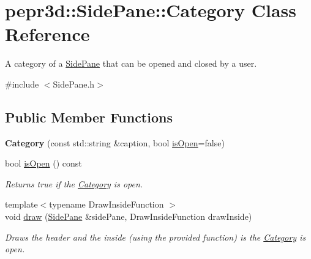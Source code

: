 \hypertarget{classpepr3d_1_1_side_pane_1_1_category}{}\section{pepr3d\+::Side\+Pane\+::Category Class Reference}
\label{classpepr3d_1_1_side_pane_1_1_category}


A category of a \mbox{\hyperlink{classpepr3d_1_1_side_pane}{Side\+Pane}} that can be opened and closed by a user.  




{\ttfamily \#include $<$Side\+Pane.\+h$>$}

\subsection*{Public Member Functions}
\begin{DoxyCompactItemize}
\item 
\mbox{\label{classpepr3d_1_1_side_pane_1_1_category_acb1fc3a5d7bd9101fcb8f4379cc70a02}} 
{\bfseries Category} (const std\+::string \&caption, bool \mbox{\hyperlink{classpepr3d_1_1_side_pane_1_1_category_aac016fcb205b58448834ba7ccb950b05}{is\+Open}}=false)
\item 
\mbox{\label{classpepr3d_1_1_side_pane_1_1_category_aac016fcb205b58448834ba7ccb950b05}} 
bool \mbox{\hyperlink{classpepr3d_1_1_side_pane_1_1_category_aac016fcb205b58448834ba7ccb950b05}{is\+Open}} () const
\begin{DoxyCompactList}\small\item\em Returns true if the \mbox{\hyperlink{classpepr3d_1_1_side_pane_1_1_category}{Category}} is open. \end{DoxyCompactList}\item 
\mbox{\label{classpepr3d_1_1_side_pane_1_1_category_a3f0786593b21a0428b8e9b8772f352ef}} 
{\footnotesize template$<$typename Draw\+Inside\+Function $>$ }\\void \mbox{\hyperlink{classpepr3d_1_1_side_pane_1_1_category_a3f0786593b21a0428b8e9b8772f352ef}{draw}} (\mbox{\hyperlink{classpepr3d_1_1_side_pane}{Side\+Pane}} \&side\+Pane, Draw\+Inside\+Function draw\+Inside)
\begin{DoxyCompactList}\small\item\em Draws the header and the inside (using the provided function) is the \mbox{\hyperlink{classpepr3d_1_1_side_pane_1_1_category}{Category}} is open. \end{DoxyCompactList}\end{DoxyCompactItemize}
